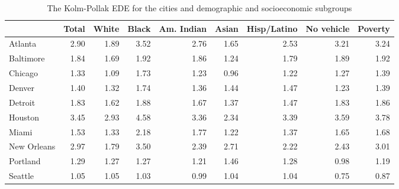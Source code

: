 \documentclass[final,3p,times,onecolumn,sort&compress]{elsarticle}
\begin{document}
\begin{table}
\caption{The Kolm-Pollak EDE for the cities and demographic and socioeconomic subgroups}
\label{tab:compare_demographics}
\begin{tabular}{lrrrrrrrr}
\hline
\textbf{}   & \textbf{Total} & \textbf{White} & \textbf{Black} & \textbf{Am. Indian} & \textbf{Asian} & \textbf{Hisp/Latino} & \textbf{No vehicle} & \textbf{Poverty} \\ \hline
Atlanta     & 2.90           & 1.89           & 3.52           & 2.76                & 1.65           & 2.53                 & 3.21                & 3.24             \\
Baltimore   & 1.84           & 1.69           & 1.92           & 1.86                & 1.24           & 1.79                 & 1.89                & 1.92             \\
Chicago     & 1.33           & 1.09           & 1.73           & 1.23                & 0.96           & 1.22                 & 1.27                & 1.39             \\
Denver      & 1.40           & 1.32           & 1.74           & 1.36                & 1.44           & 1.47                 & 1.23                & 1.39             \\
Detroit     & 1.83           & 1.62           & 1.88           & 1.67                & 1.37           & 1.47                 & 1.83                & 1.86             \\
Houston     & 3.45           & 2.93           & 4.58           & 3.36                & 2.34           & 3.39                 & 3.59                & 3.78             \\
Miami       & 1.53           & 1.33           & 2.18           & 1.77                & 1.22           & 1.37                 & 1.65                & 1.68             \\
New Orleans & 2.97           & 1.79           & 3.50           & 2.39                & 2.71           & 2.22                 & 2.43                & 3.01             \\
Portland    & 1.29           & 1.27           & 1.27           & 1.21                & 1.46           & 1.28                 & 0.98                & 1.19             \\
Seattle     & 1.05           & 1.05           & 1.03           & 0.99                & 1.04           & 1.04                 & 0.75                & 0.87             \\ \hline
\end{tabular}
\end{table}
\end{document}
